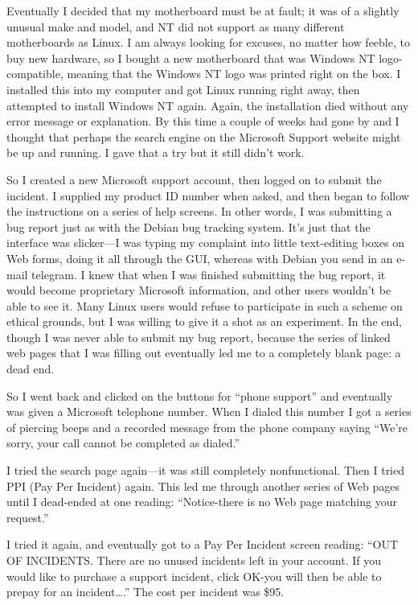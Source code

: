 \documentclass[
  fontsize=11pt,
  paper=landscape,
  twocolumn=true,
  pagesize=pdftex,
  headings=small,
  DIV=15,
  ]{scrartcl}
\begin{document}
Eventually I decided that my motherboard must be at fault; it was of a
slightly unusual make and model, and NT did not support as many
different motherboards as Linux. I am always looking for excuses, no
matter how feeble, to buy new hardware, so I bought a new motherboard
that was Windows NT logo-compatible, meaning that the Windows NT logo
was printed right on the box. I installed this into my computer and got
Linux running right away, then attempted to install Windows NT again.
Again, the installation died without any error message or explanation.
By this time a couple of weeks had gone by and I thought that perhaps
the search engine on the Microsoft Support website might be up and
running. I gave that a try but it still didn't work.

So I created a new Microsoft support account, then logged on to submit
the incident. I supplied my product ID number when asked, and then began
to follow the instructions on a series of help screens. In other words,
I was submitting a bug report just as with the Debian bug tracking
system. It's just that the interface was slicker---I was typing my
complaint into little text-editing boxes on Web forms, doing it all
through the GUI, whereas with Debian you send in an e-mail telegram. I
knew that when I was finished submitting the bug report, it would become
proprietary Microsoft information, and other users wouldn't be able to
see it. Many Linux users would refuse to participate in such a scheme on
ethical grounds, but I was willing to give it a shot as an experiment.
In the end, though I was never able to submit my bug report, because the
series of linked web pages that I was filling out eventually led me to a
completely blank page: a dead end.

So I went back and clicked on the buttons for ``phone support'' and
eventually was given a Microsoft telephone number. When I dialed this
number I got a series of piercing beeps and a recorded message from the
phone company saying ``We're sorry, your call cannot be completed as
dialed.''

I tried the search page again---it was still completely nonfunctional.
Then I tried PPI (Pay Per Incident) again. This led me through another
series of Web pages until I dead-ended at one reading: ``Notice-there is
no Web page matching your request.''

I tried it again, and eventually got to a Pay Per Incident screen
reading: ``OUT OF INCIDENTS. There are no unused incidents left in your
account. If you would like to purchase a support incident, click OK-you
will then be able to prepay for an incident\ldots{}.'' The cost per
incident was \$95.
\end{document}
